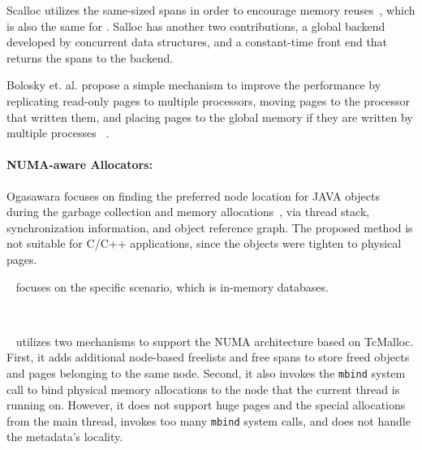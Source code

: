 
Scalloc utilizes the same-sized spans in order to encourage memory reuses~\cite{Scalloc}, which is also the same for \NM{}. Salloc has another two contributions, a global backend developed by concurrent data structures, and a constant-time front end that returns the spans to the backend. 

Bolosky et. al. propose a simple mechanism to improve the performance by replicating read-only pages to multiple processors, moving pages to the processor that written them, and placing pages to the global memory if they are written by multiple processes ~\cite{Bolosky:1989:SBE:74850.74854}.

\paragraph{NUMA-aware Allocators:} 

Ogasawara focuses on finding the preferred node location for JAVA objects during the garbage collection and memory allocations~\cite{Ogasawara:2009:NMM:1640089.1640117}, via thread stack, synchronization information, and object reference graph. The proposed method is not suitable for C/C++ applications, since the objects were tighten to physical pages. 

~\cite{wagle2015numa} focuses on the specific scenario, which is in-memory databases. 

~\cite{kim2013node}

~\cite{tcmallocnew} utilizes two mechanisms to support the NUMA architecture based on TcMalloc. First, it adds additional node-based freelists and free spans to store freed objects and pages belonging to the same node. Second, it also invokes the \texttt{mbind} system call to bind physical memory allocations to the node that the current thread is running on.  However, it does not support huge pages and the special allocations from the main thread, invokes too many \texttt{mbind} system calls, and does not handle the metadata's locality. 






